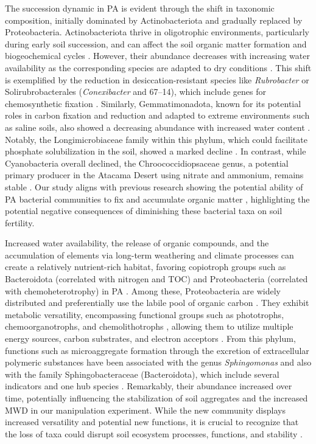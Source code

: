 The succession dynamic in PA is evident through the shift in taxonomic composition, initially dominated by Actinobacteriota and gradually replaced by Proteobacteria. Actinobacteriota thrive in oligotrophic environments, particularly during early soil succession, and can affect the soil organic matter formation and biogeochemical cycles \citep{Zhang2019, Yu2022}. However, their abundance decreases with increasing water availability as the corresponding species are adapted to dry conditions \citep{Barnard2013, Maestre2015, StovicekA2017}. This shift is exemplified by the reduction in desiccation-resistant species like \textit{Rubrobacter} or Solirubrobacterales (\textit{Conexibacter} and 67–14), which include genes for chemosynthetic  fixation \citep{SchulzeMakuch2018, Meier2019}. Similarly, Gemmatimonadota, known for its potential roles in carbon fixation and  reduction and adapted to extreme environments such as saline soils, also showed a decreasing abundance with increased water content \citep{Mujakic2022}. Notably, the Longimicrobiaceae family within this phylum, which could facilitate phosphate solubilization in the soil, showed a marked decline \citep{Korkar2022}. In contrast, while Cyanobacteria overall declined, the Chroococcidiopsaceae genus, a potential primary producer in the Atacama Desert using nitrate and ammonium, remains stable \citep{SchulzeMakuch2021}. Our study aligns with previous research showing the potential ability of PA bacterial communities to fix and accumulate organic matter \citep{Rodriguez2022}, highlighting the potential negative consequences of diminishing these bacterial taxa on soil fertility.

Increased water availability, the release of organic compounds, and the accumulation of elements via long-term weathering and climate processes can create a relatively nutrient-rich habitat, favoring copiotroph groups such as Bacteroidota (correlated with nitrogen and TOC) and Proteobacteria (correlated with chemoheterotrophy) in PA \citep{Na2019, Zhao2019}. Among these, Proteobacteria are widely distributed and preferentially use the labile pool of organic carbon \citep{Fierer2007}. They exhibit metabolic versatility, encompassing functional groups such as phototrophs, chemoorganotrophs, and chemolithotrophs \citep{Kersters2006}, allowing them to utilize multiple energy sources, carbon substrates, and electron acceptors \citep{ChenNeilson2021}. From this phylum, functions such as microaggregate formation through the excretion of extracellular polymeric substances have been associated with the genus \textit{Sphingomonas} and also with the family Sphingobacteraceae (Bacteroidota), which include several indicators and one hub species \citep{CaesarTonthat2007, Pankratov2007, Vuko2020}. Remarkably, their abundance increased over time, potentially influencing the stabilization of soil aggregates and the increased MWD in our manipulation experiment. While the new community displays increased versatility and potential new functions, it is crucial to recognize that the loss of taxa could disrupt soil ecosystem processes, functions, and stability \citep{Bestion2020}.

